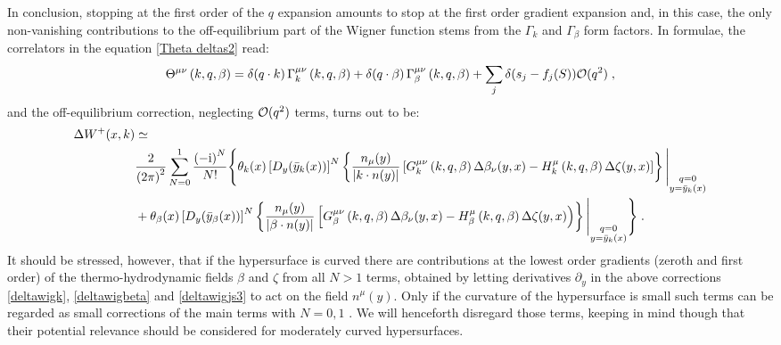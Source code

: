 \documentclass[prd,superscriptaddress,nofootinbib,notitlepage]{revtex4-1}
\newcommand{\ii}{{\rm i}}
\newcommand{\y}{{\mathbf{y}}}
\begin{document}
In conclusion, stopping at the first order of the $q$ expansion amounts to stop at the first order gradient expansion and, 
in this case, the only non-vanishing contributions to the off-equilibrium part of the Wigner function stems from the $\Gamma_k$ 
and $\Gamma_\beta$ form factors. In formulae, the correlators in the equation \eqref{Theta deltas2} read:
%
$$
 \Theta^{\mu\nu}\left(k,q,\beta\right) = \delta(q \cdot k)\, \Gamma^{\mu\nu}_k\left(k,q,\beta\right) + \delta(q \cdot \beta)\, 
 \Gamma^{\mu\nu}_\beta\left(k,q,\beta\right) + \sum_{j} \delta(s_j - f_j(S)){\cal O}(q^2)\;,
$$
%
and the off-equilibrium correction, neglecting ${\cal O}(q^2)$ terms, turns out to be:
%
\begin{align}\label{deltawig1storder}
\Delta W^+(x,k) &\simeq \nonumber \\
& \frac{2}{\left(2\pi\right)^2}\sum_{N=0}^{1} 
\frac{\left(-\ii \right)^N}{N!}\Bigg\{\theta_k(x) 
\left[D_y(\bar{y}_k(x))\right]^N \left\{ \frac{n_{\mu}(y)}{|k\cdot n(y)|} \left[G_k^{\mu\nu}\left(k,q,\beta\right) 
\Delta\beta_{\nu}(y,x) - H_k^\mu\left(k,q,\beta\right) \Delta \zeta(y,x) \right]\right\}\Bigg|_{\substack{q=0 \\y=\bar y_k(x)}} \nonumber \\
&+\theta_\beta(x) 
\left[D_y(\bar{y}_\beta(x))\right]^N \left\{ \frac{n_{\mu}(y)}{|\beta \cdot n(y)|} \left[ G_\beta^{\mu\nu}\left(k,q,\beta\right) 
\Delta\beta_{\nu}(y,x) - H_\beta^\mu\left(k,q,\beta\right) \Delta \zeta(y,x) \right) \right\} \Bigg|_{\substack{q=0 \\y=\bar y_k(x)}} \Bigg\}\;.
\end{align}
%
It should be stressed, however, that if the hypersurface is curved there are contributions at
the lowest order gradients (zeroth and first order) of the thermo-hydrodynamic fields $\beta$ and $\zeta$ from all $N > 1$ terms, 
obtained by letting derivatives $\partial_y$ in the above corrections \eqref{deltawigk}, \eqref{deltawigbeta} and 
\eqref{deltawigjs3} to act on the field $n^\mu(y)$. Only if the curvature of the hypersurface is small such terms can be 
regarded as small corrections of the main terms with $N=0,1$ \cite{Zhang:2025vlk}. We will henceforth disregard those terms,
keeping in mind though that their potential relevance should be considered for moderately curved hypersurfaces.
\end{document}
